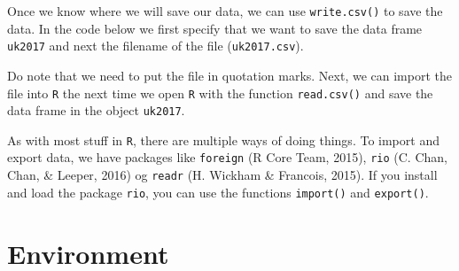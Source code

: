 \documentclass[12pt,oneside]{reedthesis}
\theoremstyle{definition}
\theoremstyle{definition}
\theoremstyle{definition}
\theoremstyle{remark}
\begin{document}
  Once we know where we will save our data, we can use
  \texttt{write.csv()} to save the data. In the code below we first
  specify that we want to save the data frame \texttt{uk2017} and next the
  filename of the file (\texttt{uk2017.csv}).
  \begin{Shaded}
  \begin{Highlighting}[]
  \NormalTok{)}
  \end{Highlighting}
  \end{Shaded}
  Do note that we need to put the file in quotation marks. Next, we can
  import the file into \texttt{R} the next time we open \texttt{R} with
  the function \texttt{read.csv()} and save the data frame in the object
  \texttt{uk2017}.
  \begin{Shaded}
  \begin{Highlighting}[]
  \StringTok{ }\NormalTok{(}\NormalTok{)}
  \end{Highlighting}
  \end{Shaded}
  As with most stuff in \texttt{R}, there are multiple ways of doing
  things. To import and export data, we have packages like
  \texttt{foreign} (R Core Team, 2015), \texttt{rio} (C. Chan, Chan, \&
  Leeper, 2016) og \texttt{readr} (H. Wickham \& Francois, 2015). If you
  install and load the package \texttt{rio}, you can use the functions
  \texttt{import()} and \texttt{export()}.
  \begin{Shaded}
  \begin{Highlighting}[]
  \NormalTok{)}
  
  \StringTok{ }\NormalTok{(}\NormalTok{)}
  \end{Highlighting}
  \end{Shaded}
  \section{Environment}\label{environment}
  
\end{document}
